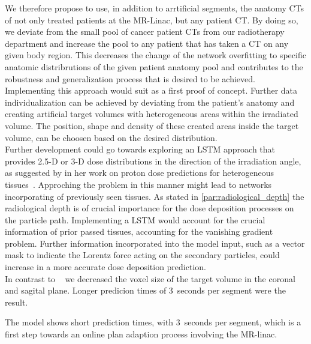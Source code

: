 We therefore propose to use, in addition to arrtificial segments, the anatomy CTs of not only treated patients at the MR-Linac, but any patient CT\@.
By doing so, we deviate from the small pool of cancer patient CTs from our radiotherapy department and increase the pool to any patient that has taken a CT on any given body region.
This decreases the change of the network overfitting to specific anatomic distribrutions of the given patient anatomy pool and contributes to the robustness and generalization process that is desired to be achieved.
Implementing this approach would suit as a first proof of concept. 
Further data individualization can be achieved by deviating from the patient's anatomy and creating artificial target volumes with heterogeneous areas within the irradiated volume.
The position, shape and density of these created areas inside the target volume, can be choosen based on the desired distribution.\\

Further development could go towards exploring an LSTM approach that provides 2.5-D or 3-D dose distributions in the direction of the irradiation angle, as suggested by \citeauthor{neishabouri_long_2020} in her work on proton dose predictions for heterogeneous tissues~\cite{neishabouri_long_2020}. 
Approching the problem in this manner might lead to networks incorporating of previously seen tissues.
As stated in \autoref{par:radiological_depth} the radiological depth is of crucial importance for the dose deposition processes on the particle path.
Implementing a LSTM would account for the crucial information of prior passed tissues, accounting for the vanishing gradient problem. 
Further information incorporated into the model input, such as a vector mask to indicate the Lorentz force acting on the secondary particles, could increase in a more accurate dose deposition prediction.\\

In contrast to \citeauthor{kontaxis_deepdose_2020}~\cite{kontaxis_deepdose_2020} we decreased the voxel size of the target volume in the coronal and sagital plane. 
Longer predicion times of 3~seconds per segment were the result.

The model shows short prediction times, with 3~seconds per segment, which is a first step towards an online plan adaption process involving the MR-linac.






